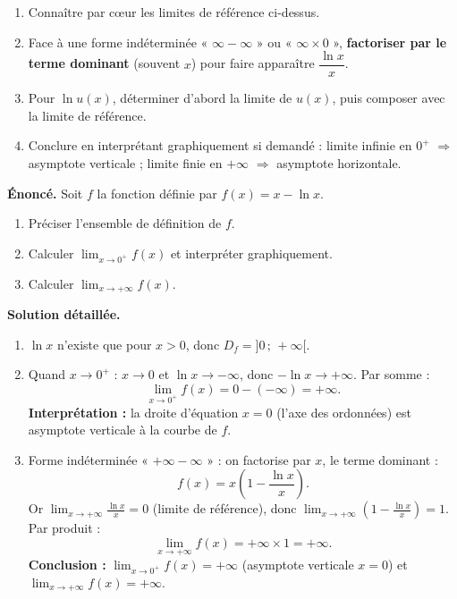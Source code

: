 \documentclass[11pt]{article}
\newcommand{\cle}[1]{{\popxbold\color{popdark}#1}}
\begin{document}
\begin{methode}
\begin{enumerate}
\item Connaître par cœur les \cle{limites de référence} ci-dessus.
\item Face à une forme indéterminée « $\infty - \infty$ » ou « $\infty\times 0$ », \textbf{factoriser par le terme dominant} (souvent $x$) pour faire apparaître $\dfrac{\ln x}{x}$.
\item Pour $\ln u(x)$, déterminer d'abord la limite de $u(x)$, puis composer avec la limite de référence.
\item Conclure en interprétant graphiquement si demandé : limite infinie en $0^+$ $\Rightarrow$ asymptote verticale ; limite finie en $+\infty$ $\Rightarrow$ asymptote horizontale.
\end{enumerate}
\end{methode}

\begin{exoresolu}
\textbf{Énoncé.} Soit $f$ la fonction définie par $f(x)=x-\ln x$.
\begin{enumerate}
\item Préciser l'ensemble de définition de $f$.
\item Calculer $\displaystyle\lim_{x\to 0^+} f(x)$ et interpréter graphiquement.
\item Calculer $\displaystyle\lim_{x\to +\infty} f(x)$.
\end{enumerate}
\tcblower
\textbf{Solution détaillée.}
\begin{enumerate}
\item $\ln x$ n'existe que pour $x>0$, donc $D_f = ]0\,;\,+\infty[$.
\item Quand $x\to 0^+$ : $x\to 0$ et $\ln x \to -\infty$, donc $-\ln x \to +\infty$. Par somme :
\[ \lim_{x\to 0^+} f(x) = 0 - (-\infty) = +\infty. \]
\textbf{Interprétation :} la droite d'équation $x=0$ (l'axe des ordonnées) est \cle{asymptote verticale} à la courbe de $f$.
\item Forme indéterminée « $+\infty - \infty$ » : on factorise par $x$, le terme dominant :
\[ f(x) = x\left(1-\frac{\ln x}{x}\right). \]
Or $\displaystyle\lim_{x\to+\infty}\frac{\ln x}{x}=0$ (limite de référence), donc $\displaystyle\lim_{x\to+\infty}\left(1-\frac{\ln x}{x}\right)=1$. Par produit :
\[ \lim_{x\to +\infty} f(x) = +\infty \times 1 = +\infty. \]
\textbf{Conclusion :} $\displaystyle\lim_{x\to 0^+}f(x)=+\infty$ (asymptote verticale $x=0$) et $\displaystyle\lim_{x\to +\infty}f(x)=+\infty$.
\end{enumerate}
\end{exoresolu}
\end{document}
